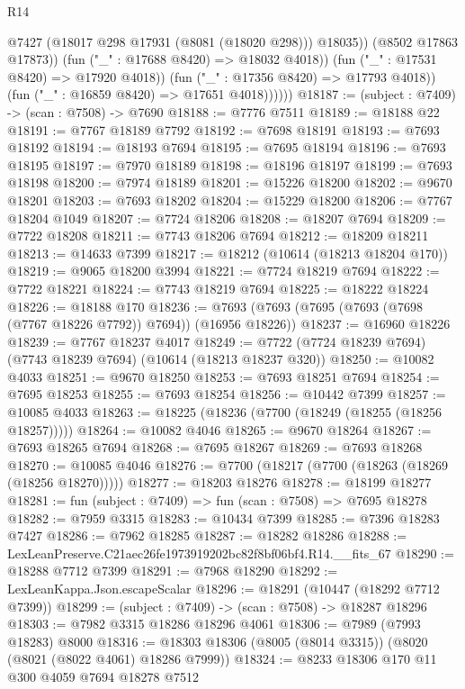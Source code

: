 \begin{lexlean}{R14}
\begin{coremodule}
                          @7427
                          (@18017 @298 @17931 (@8081 (@18020 @298)))
                          @18035))
                      (@8502 @17863 @17873))
                    (fun ("_" : @17688 @8420) => @18032 @4018))
                  (fun ("_" : @17531 @8420) => @17920 @4018))
                (fun ("_" : @17356 @8420) => @17793 @4018))
              (fun ("_" : @16859 @8420) => @17651 @4018))))))
@18187 := (subject : @7409) -> (scan : @7508) -> @7690
@18188 := @7776 @7511
@18189 := @18188 @22
@18191 := @7767 @18189 @7792
@18192 := @7698 @18191
@18193 := @7693 @18192
@18194 := @18193 @7694
@18195 := @7695 @18194
@18196 := @7693 @18195
@18197 := @7970 @18189
@18198 := @18196 @18197
@18199 := @7693 @18198
@18200 := @7974 @18189
@18201 := @15226 @18200
@18202 := @9670 @18201
@18203 := @7693 @18202
@18204 := @15229 @18200
@18206 := @7767 @18204 @1049
@18207 := @7724 @18206
@18208 := @18207 @7694
@18209 := @7722 @18208
@18211 := @7743 @18206 @7694
@18212 := @18209 @18211
@18213 := @14633 @7399
@18217 := @18212 (@10614 (@18213 @18204 @170))
@18219 := @9065 @18200 @3994
@18221 := @7724 @18219 @7694
@18222 := @7722 @18221
@18224 := @7743 @18219 @7694
@18225 := @18222 @18224
@18226 := @18188 @170
@18236 := @7693 (@7693 (@7695 (@7693 (@7698 (@7767 @18226 @7792)) @7694)) (@16956 @18226))
@18237 := @16960 @18226
@18239 := @7767 @18237 @4017
@18249 := @7722 (@7724 @18239 @7694) (@7743 @18239 @7694) (@10614 (@18213 @18237 @320))
@18250 := @10082 @4033
@18251 := @9670 @18250
@18253 := @7693 @18251 @7694
@18254 := @7695 @18253
@18255 := @7693 @18254
@18256 := @10442 @7399
@18257 := @10085 @4033
@18263 := @18225 (@18236 (@7700 (@18249 (@18255 (@18256 @18257)))))
@18264 := @10082 @4046
@18265 := @9670 @18264
@18267 := @7693 @18265 @7694
@18268 := @7695 @18267
@18269 := @7693 @18268
@18270 := @10085 @4046
@18276 := @7700 (@18217 (@7700 (@18263 (@18269 (@18256 @18270)))))
@18277 := @18203 @18276
@18278 := @18199 @18277
@18281 := fun (subject : @7409) => fun (scan : @7508) => @7695 @18278
@18282 := @7959 @3315
@18283 := @10434 @7399
@18285 := @7396 @18283 @7427
@18286 := @7962 @18285
@18287 := @18282 @18286
@18288 := LexLeanPreserve.C21aec26fe1973919202bc82f8bf06bf4.R14.__fits_67
@18290 := @18288 @7712 @7399
@18291 := @7968 @18290
@18292 := LexLeanKappa.Json.escapeScalar
@18296 := @18291 (@10447 (@18292 @7712 @7399))
@18299 := (subject : @7409) -> (scan : @7508) -> @18287 @18296
@18303 := @7982 @3315 @18286 @18296 @4061
@18306 := @7989 (@7993 @18283) @8000
@18316 := @18303 @18306 (@8005 (@8014 @3315)) (@8020 (@8021 (@8022 @4061) @18286 @7999))
@18324 := @8233 @18306 @170 @11 @300 @4059 @7694 @18278 @7512

\end{coremodule}
\end{lexlean}
